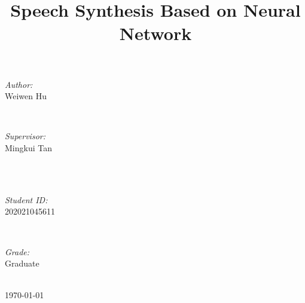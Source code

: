 \documentclass[journal, a4paper]{IEEEtran}
\begin{document}
\begin{titlepage}
\begin{minipage}{0.4\textwidth}
\begin{flushleft} \large
\emph{Author:}\\
Weiwen Hu
\end{flushleft}
\end{minipage}
~
\begin{minipage}{0.4\textwidth}
\begin{flushright} \large
\emph{Supervisor:} \\
Mingkui Tan
\end{flushright}
\end{minipage}\\[2cm]
~
\begin{minipage}{0.4\textwidth}
\begin{flushleft} \large
\emph{Student ID:}\\
202021045611
\end{flushleft}
\end{minipage}
~
\begin{minipage}{0.4\textwidth}
\begin{flushright} \large
\emph{Grade:} \\
Graduate
\end{flushright}
\end{minipage}\\[2cm]



{\large \today}\\[2cm] %



\vfill %

\end{titlepage}

	\title{Speech Synthesis Based on Neural Network}
	\maketitle
\end{document}
